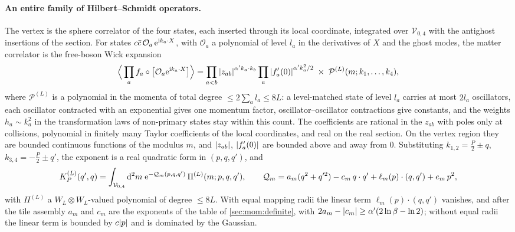 \paragraph{An entire family of Hilbert--Schmidt operators.}
The vertex is the sphere correlator of the four states, each inserted through its local coordinate, integrated over $\mathcal V_{0, 4}$ with the antighost insertions of the section.
For states $c \bar c \, \mathcal O_a \, \mathrm{e}^{\mathrm{i} k_a \cdot X}$, with $\mathcal O_a$ a polynomial of level $l_a$ in the derivatives of $X$ and the ghost modes, the matter correlator is the free-boson Wick expansion
\begin{equation}
  \label{eq:mom:wick}
  \Big\langle \prod_a f_a \circ \big[ \mathcal O_a \mathrm{e}^{\mathrm{i} k_a \cdot X} \big] \Big\rangle
    = \prod_{a < b} {|z_{ab}|}^{\alpha' k_a \cdot k_b} \prod_a {|f_a'(0)|}^{\alpha' k_a^2 / 2} \;\times\; \mathcal P^{(L)}(m; k_1, \ldots, k_4),
\end{equation}
where $\mathcal P^{(L)}$ is a polynomial in the momenta of total degree $\le 2 \sum_a l_a \le 8 L$: a level-matched state of level $l_a$ carries at most $2 l_a$ oscillators, each oscillator contracted with an exponential gives one momentum factor, oscillator--oscillator contractions give constants, and the weights $h_a \sim k_a^2$ in the transformation laws of non-primary states stay within this count.
The coefficients are rational in the $z_{ab}$ with poles only at collisions, polynomial in finitely many Taylor coefficients of the local coordinates, and real on the real section.
On the vertex region they are bounded continuous functions of the modulus $m$, and ${|z_{ab}|}$, ${|f_a'(0)|}$ are bounded above and away from $0$.
Substituting $k_{1, 2} = \tfrac{P}{2} \pm q$, $k_{3, 4} = - \tfrac{P}{2} \pm q'$, the exponent is a real quadratic form in $(p, q, q')$, and
\begin{equation}
  \label{eq:mom:exp-poly}
  K^{(L)}_P(q', q)
    = \int_{\mathcal V_{0, 4}} \mathrm{d}^2 m \; \mathrm{e}^{- \mathcal Q_m(p, q, q')} \, \Pi^{(L)}(m; p, q, q'),
  \qquad
  \mathcal Q_m
    = a_m (q^2 + q'^2) - c_m \, q \cdot q' + \ell_m(p) \cdot (q, q') + e_m \, p^2,
\end{equation}
with $\Pi^{(L)}$ a $W_L \otimes W_L$-valued polynomial of degree $\le 8 L$.
With equal mapping radii the linear term $\ell_m(p) \cdot (q, q')$ vanishes, and after the tile assembly $a_m$ and $c_m$ are the exponents of the table of \cref{sec:mom:definite}, with $2 a_m - {|c_m|} \ge \alpha' (2 \ln \beta - \ln 2)$; without equal radii the linear term is bounded by $c {|p|}$ and is dominated by the Gaussian.
